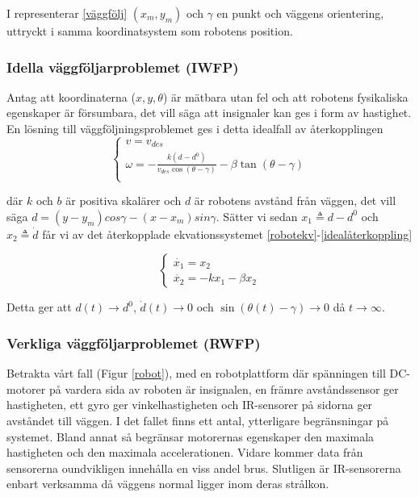 \documentclass[11pt]{article}
\begin{document}
\begin{flushleft}
I representerar \eqref{väggfölj} \((x_m, y_m)\) och \(\gamma\) en punkt och väggens orientering, uttryckt i samma koordinatsystem som robotens position.

\subsubsection{Idella väggföljarproblemet (IWFP)}
Antag att  koordinaterna (\(x, y, \theta\)) är mätbara utan fel och att robotens fysikaliska egenskaper är försumbara, det vill säga att insignaler kan ges i form av hastighet. En lösning till väggföljningsproblemet ges i detta idealfall av återkopplingen
\begin{equation}\label{idealåterkoppling}
	\begin{cases}
	v = v_{des} \\
	\omega = -\frac{k(d - d^0)}{v_{des} \cos (\theta - \gamma)} - \beta \tan (\theta - \gamma) \\
	\end{cases}
\end{equation}

där \(k\) och \(b\) är positiva skalärer och \(d\) är robotens avstånd från väggen, det vill säga \(d = (y - y_m)cos\gamma - (x - x_m)sin\gamma\). Sätter vi sedan \(x_1 \triangleq d - d^0\) och \(x_2 \triangleq \dot{d}\) får vi av det återkopplade ekvationssystemet \eqref{robotekv}-\eqref{idealåterkoppling}

\begin{equation}
	\begin{cases}
	\dot{x_1} = x_2 \\
	\dot{x_2} = -kx_1 - \beta x_2
	\end{cases}
\end{equation}

Detta ger att \(d(t) \to d^0\), \(\dot{d}(t) \to 0\) och \(\sin (\theta(t) - \gamma) \to 0\) då \(t \to \infty\).

\subsubsection{Verkliga väggföljarproblemet (RWFP)}\label{rwfp}
Betrakta vårt fall (Figur \ref{robot}), med en robotplattform där spänningen till DC-motorer på vardera sida av roboten är insignalen, en främre avståndssensor ger hastigheten, ett gyro ger vinkelhastigheten och IR-sensorer på sidorna ger avståndet till väggen. I det fallet finns ett antal, ytterligare begränsningar på systemet. Bland annat så begränsar motorernas egenskaper den maximala hastigheten och den maximala accelerationen. Vidare kommer data från sensorerna oundvikligen innehålla en viss andel brus. Slutligen är IR-sensorerna enbart verksamma då  väggens normal ligger inom deras strålkon.


\end{flushleft}
\end{document}

